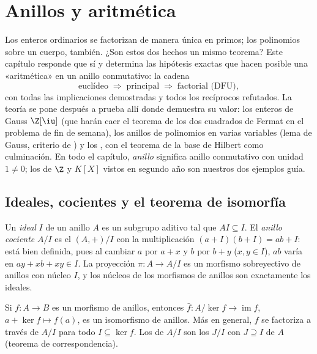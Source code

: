 \chapter{Anillos y aritmética}\label{ch:b3:rings}

Los enteros ordinarios se factorizan de manera única en primos; los
polinomios sobre un cuerpo, también. ¿Son estos dos hechos un mismo
teorema? Este capítulo responde que sí y determina las hipótesis exactas
que hacen posible una «aritmética» en un anillo conmutativo: la cadena
\[
\text{euclídeo} \;\Longrightarrow\; \text{principal}
\;\Longrightarrow\; \text{factorial (DFU)},
\]
con todas las implicaciones demostradas y todos los recíprocos
refutados. La teoría se pone después a prueba allí donde demuestra su
valor: los enteros de Gauss $\Z[\iu]$ (que harán caer el teorema de los
dos cuadrados de Fermat en el problema de fin de semana), los anillos de
polinomios en varias variables (lema de Gauss, criterio de
) y los
, con el teorema
de la base de Hilbert como culminación. En todo el capítulo,
\emph{anillo} significa anillo conmutativo con unidad $1 \neq 0$; los
 de $\Z$ y $K[X]$ vistos en segundo
año son nuestros dos ejemplos guía.

\section{Ideales, cocientes y el teorema de isomorfía}

\begin{definition}\label{def:b3:rings:ideal}
Un \emph{ideal} $I$ de un anillo $A$ es un subgrupo aditivo
tal que $AI \subseteq I$. El \emph{anillo cociente} $A/I$ es el 
$(A, +)/I$ con la multiplicación $(a + I)(b + I) = ab + I$: está bien
definida, pues al cambiar $a$ por $a + x$ y $b$ por $b + y$
($x, y \in I$), $ab$ varía en $ay + xb + xy \in I$. La proyección
$\pi \colon A
\to A/I$ es un morfismo sobreyectivo de anillos con núcleo $I$, y los
núcleos de los morfismos de anillos son exactamente los ideales.
\end{definition}

\begin{theorem}\label{thm:b3:rings:firstiso}
Si $f \colon A \to B$ es un morfismo de anillos, entonces $\bar f\colon
A/\ker f \to \operatorname{im} f$, $a + \ker f \mapsto f(a)$, es un
isomorfismo de anillos. Más en general, $f$ se factoriza a través de
$A/I$ para todo  $I \subseteq \ker f$.
Los  de $A/I$ son los $J/I$ con
$J \supseteq I$  de $A$ (teorema de
correspondencia).
\end{theorem}

